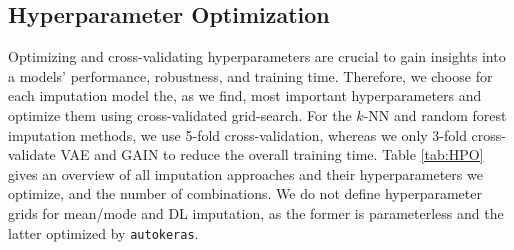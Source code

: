 \documentclass[utf8]{frontiersSCNS} %
\newcommand{\code}[1]{\texttt{#1}}
\begin{document}
\subsection{Hyperparameter Optimization}
\label{sec:HPO}
%
Optimizing and cross-validating hyperparameters are crucial to gain insights into a models' performance, robustness, and training time. Therefore, we choose for each imputation model the, as we find, most important hyperparameters and optimize them using cross-validated grid-search. For the $k$-NN and random forest imputation methods, we use 5-fold cross-validation, whereas we only 3-fold cross-validate VAE and GAIN to reduce the overall training time. Table \ref{tab:HPO} gives an overview of all imputation approaches and their hyperparameters we optimize, and the number of combinations. We do not define hyperparameter grids for mean/mode and DL imputation, as the former is parameterless and the latter optimized by \code{autokeras}.
%
\end{document}
